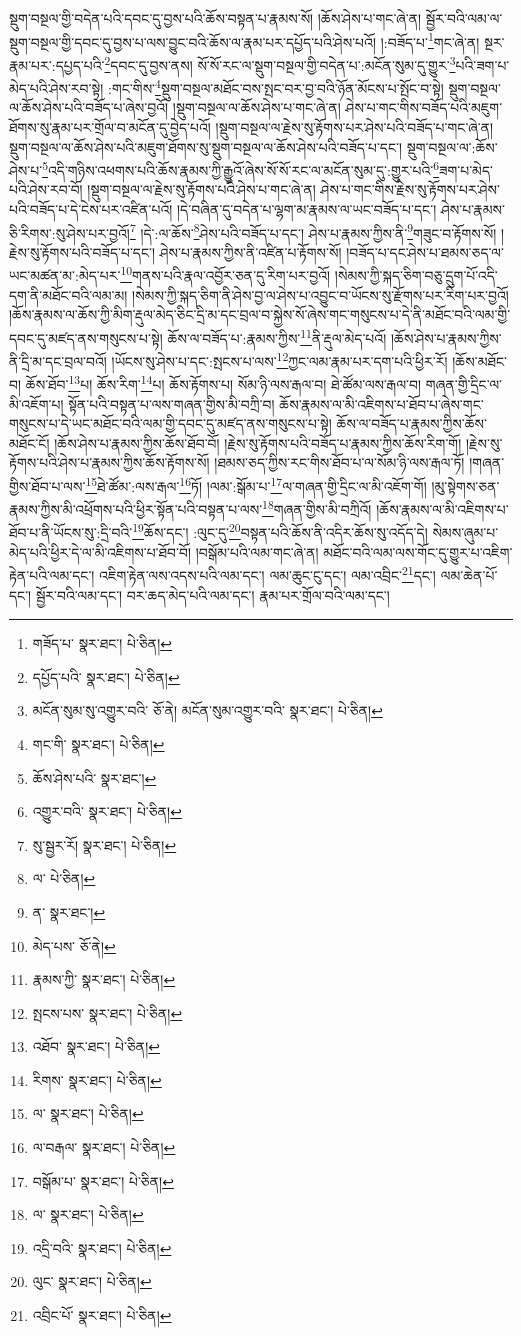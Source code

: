 སྡུག་བསྔལ་གྱི་བདེན་པའི་དབང་དུ་བྱས་པའི་ཆོས་བསྟན་པ་རྣམས་སོ། །ཆོས་ཤེས་པ་གང་ཞེ་ན། སྦྱོར་བའི་ལམ་ལ་སྡུག་བསྔལ་གྱི་དབང་དུ་བྱས་པ་ལས་བྱུང་བའི་ཆོས་ལ་རྣམ་པར་དཔྱོད་པའི་ཤེས་པའོ། །:བཟོད་པ་\footnote{གཟོད་པ་  སྣར་ཐང་།  པེ་ཅིན། }གང་ཞེ་ན། སྔར་རྣམ་པར་:དཔྱད་པའི་\footnote{དཔྱོད་པའི་  སྣར་ཐང་།  པེ་ཅིན། }དབང་དུ་བྱས་ནས། སོ་སོ་རང་ལ་སྡུག་བསྔལ་གྱི་བདེན་པ་:མངོན་སུམ་དུ་གྱུར་\footnote{མངོན་སུམ་སུ་འགྱུར་བའི་  ཅོ་ནེ། མངོན་སུམ་འགྱུར་བའི་  སྣར་ཐང་།  པེ་ཅིན། }པའི་ཟག་པ་མེད་པའི་ཤེས་རབ་སྟེ། :གང་གིས་\footnote{གང་གི་  སྣར་ཐང་།  པེ་ཅིན། }སྡུག་བསྔལ་མཐོང་བས་སྤང་བར་བྱ་བའི་ཉོན་མོངས་པ་སྤོང་བ་སྟེ། སྡུག་བསྔལ་ལ་ཆོས་ཤེས་པའི་བཟོད་པ་ཞེས་བྱའོ། །སྡུག་བསྔལ་ལ་ཆོས་ཤེས་པ་གང་ཞེ་ན། ཤེས་པ་གང་གིས་བཟོད་པའི་མཇུག་ཐོགས་སུ་རྣམ་པར་གྲོལ་བ་མངོན་དུ་བྱེད་པའོ། །སྡུག་བསྔལ་ལ་རྗེས་སུ་རྟོགས་པར་ཤེས་པའི་བཟོད་པ་གང་ཞེ་ན། སྡུག་བསྔལ་ལ་ཆོས་ཤེས་པའི་མཇུག་ཐོགས་སུ་སྡུག་བསྔལ་ལ་ཆོས་ཤེས་པའི་བཟོད་པ་དང་། སྡུག་བསྔལ་ལ་:ཆོས་ཤེས་པ་\footnote{ཆོས་ཤེས་པའི་  སྣར་ཐང་། }འདི་གཉིས་འཕགས་པའི་ཆོས་རྣམས་ཀྱི་རྒྱུའོ་ཞེས་སོ་སོ་རང་ལ་མངོན་སུམ་དུ་:གྱུར་པའི་\footnote{འགྱུར་བའི་  སྣར་ཐང་།  པེ་ཅིན། }ཟག་པ་མེད་པའི་ཤེས་རབ་བོ། །སྡུག་བསྔལ་ལ་རྗེས་སུ་རྟོགས་པའི་ཤེས་པ་གང་ཞེ་ན། ཤེས་པ་གང་གིས་རྗེས་སུ་རྟོགས་པར་ཤེས་པའི་བཟོད་པ་དེ་ངེས་པར་འཛིན་པའོ། །དེ་བཞིན་དུ་བདེན་པ་ལྷག་མ་རྣམས་ལ་ཡང་བཟོད་པ་དང་། ཤེས་པ་རྣམས་ཅི་རིགས་:སུ་ཤེས་པར་བྱའོ།\footnote{སུ་སྦྱར་རོ།  སྣར་ཐང་།  པེ་ཅིན། } །དེ་:ལ་ཆོས་\footnote{ལ་  པེ་ཅིན། }ཤེས་པའི་བཟོད་པ་དང་། ཤེས་པ་རྣམས་ཀྱིས་ནི་\footnote{ན་  སྣར་ཐང་། }གཟུང་བ་རྟོགས་སོ། །རྗེས་སུ་རྟོགས་པའི་བཟོད་པ་དང་། ཤེས་པ་རྣམས་ཀྱིས་ནི་འཛིན་པ་རྟོགས་སོ། །བཟོད་པ་དང་ཤེས་པ་ཐམས་ཅད་ལ་ཡང་མཚན་མ་:མེད་པར་\footnote{མེད་པས་  ཅོ་ནེ། }གནས་པའི་རྣལ་འབྱོར་ཅན་དུ་རིག་པར་བྱའོ། །སེམས་ཀྱི་སྐད་ཅིག་བཅུ་དྲུག་པོ་འདི་དག་ནི་མཐོང་བའི་ལམ་མ། །སེམས་ཀྱི་སྐད་ཅིག་ནི་ཤེས་བྱ་ལ་ཤེས་པ་འབྱུང་བ་ཡོངས་སུ་རྫོགས་པར་རིག་པར་བྱའོ། །ཆོས་རྣམས་ལ་ཆོས་ཀྱི་མིག་རྡུལ་མེད་ཅིང་དྲི་མ་དང་བྲལ་བ་སྐྱེས་སོ་ཞེས་གང་གསུངས་པ་དེ་ནི་མཐོང་བའི་ལམ་གྱི་དབང་དུ་མཛད་ནས་གསུངས་པ་སྟེ། ཆོས་ལ་བཟོད་པ་:རྣམས་ཀྱིས་\footnote{རྣམས་ཀྱི་  སྣར་ཐང་།  པེ་ཅིན། }ནི་རྡུལ་མེད་པའོ། །ཆོས་ཤེས་པ་རྣམས་ཀྱིས་ནི་དྲི་མ་དང་བྲལ་བའོ། །ཡོངས་སུ་ཤེས་པ་དང་:སྤངས་པ་ལས་\footnote{སྤངས་པས་  སྣར་ཐང་།  པེ་ཅིན། }ཀྱང་ལམ་རྣམ་པར་དག་པའི་ཕྱིར་རོ། །ཆོས་མཐོང་བ། ཆོས་ཐོབ་\footnote{འཐོབ་  སྣར་ཐང་།  པེ་ཅིན། }པ། ཆོས་རིག་\footnote{རིགས་  སྣར་ཐང་།  པེ་ཅིན། }པ། ཆོས་རྟོགས་པ། སོམ་ཉི་ལས་རྒལ་བ། ཐེ་ཚོམ་ལས་རྒལ་བ། གཞན་གྱི་དྲིང་ལ་མི་འཇོག་པ། སྟོན་པའི་བསྟན་པ་ལས་གཞན་གྱིས་མི་བཀྲི་བ། ཆོས་རྣམས་ལ་མི་འཇིགས་པ་ཐོབ་པ་ཞེས་གང་གསུངས་པ་དེ་ཡང་མཐོང་བའི་ལམ་གྱི་དབང་དུ་མཛད་ནས་གསུངས་པ་སྟེ། ཆོས་ལ་བཟོད་པ་རྣམས་ཀྱིས་ཆོས་མཐོང་ངོ། །ཆོས་ཤེས་པ་རྣམས་ཀྱིས་ཆོས་ཐོབ་བོ། །རྗེས་སུ་རྟོགས་པའི་བཟོད་པ་རྣམས་ཀྱིས་ཆོས་རིག་གོ། །རྗེས་སུ་རྟོགས་པའི་ཤེས་པ་རྣམས་ཀྱིས་ཆོས་རྟོགས་སོ། །ཐམས་ཅད་ཀྱིས་རང་གིས་ཐོབ་པ་ལ་སོམ་ཉི་ལས་རྒལ་ཏོ། །གཞན་གྱིས་ཐོབ་པ་ལས་\footnote{ལ་  སྣར་ཐང་།  པེ་ཅིན། }ཐེ་ཚོམ་:ལས་རྒལ་\footnote{ལ་བརྒལ་  སྣར་ཐང་།  པེ་ཅིན། }ཏོ། །ལམ་:སྒོམ་པ་\footnote{བསྒོམ་པ་  སྣར་ཐང་།  པེ་ཅིན། }ལ་གཞན་གྱི་དྲིང་ལ་མི་འཇོག་གོ། །མུ་སྟེགས་ཅན་རྣམས་ཀྱིས་མི་འཕྲོགས་པའི་ཕྱིར་སྟོན་པའི་བསྟན་པ་ལས་\footnote{ལ་  སྣར་ཐང་།  པེ་ཅིན། }གཞན་གྱིས་མི་བཀྲིའོ། །ཆོས་རྣམས་ལ་མི་འཇིགས་པ་ཐོབ་པ་ནི་ཡོངས་སུ་:དྲི་བའི་\footnote{འདྲི་བའི་  སྣར་ཐང་།  པེ་ཅིན། }ཆོས་དང་། :ལུང་དུ་\footnote{ལུང་  སྣར་ཐང་།  པེ་ཅིན། }བསྟན་པའི་ཆོས་ནི་འདིར་ཆོས་སུ་འདོད་དེ། སེམས་ཞུམ་པ་མེད་པའི་ཕྱིར་དེ་ལ་མི་འཇིགས་པ་ཐོབ་བོ། །བསྒོམ་པའི་ལམ་གང་ཞེ་ན། མཐོང་བའི་ལམ་ལས་གོང་དུ་གྱུར་པ་འཇིག་རྟེན་པའི་ལམ་དང་། འཇིག་རྟེན་ལས་འདས་པའི་ལམ་དང་། ལམ་ཆུང་ངུ་དང་། ལམ་འབྲིང་\footnote{འབྲིང་པོ་  སྣར་ཐང་།  པེ་ཅིན། }དང་། ལམ་ཆེན་པོ་དང་། སྦྱོར་བའི་ལམ་དང་། བར་ཆད་མེད་པའི་ལམ་དང་། རྣམ་པར་གྲོལ་བའི་ལམ་དང་། 